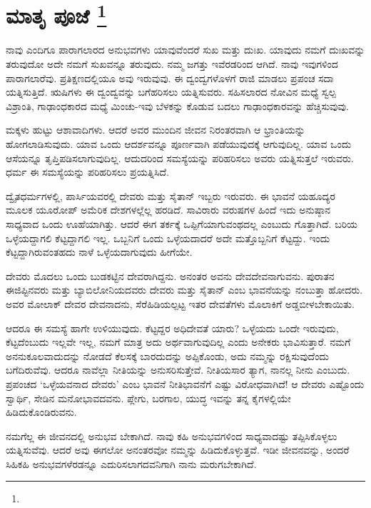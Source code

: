 
\chapter[ಮಾತೃ ಪೂಜೆ ]{ಮಾತೃ ಪೂಜೆ \protect\footnote{}}

ನಾವು ಎಂದಿಗೂ ಪಾರಾಗಲಾರದ ಅನುಭವಗಳು ಯಾವುವೆಂದರೆ ಸುಖ ಮತ್ತು ದುಃಖ. ಯಾವುದು ನಮಗೆ ದುಃಖವನ್ನು ತರುವುದೋ ಅದೇ ನಮಗೆ ಸುಖವನ್ನೂ ತರುವುದು. ನಮ್ಮ ಜಗತ್ತು ಇವೆರಡರಿಂದ ಆಗಿದೆ. ನಾವು ಇವುಗಳಿಂದ ಪಾರಾಗಲಾರೆವು. ಪ್ರತಿಕ್ಷಣದಲ್ಲಿಯೂ ಅವು ಇರುವುವು. ಈ ದ್ವಂದ್ವಗಳೊಳಗೆ ರಾಜಿ ಮಾಡಲು ಪ್ರಪಂಚ ಸದಾ ಯತ್ನಿಸುತ್ತಿದೆ. ಋಷಿಗಳು ಈ ದ್ವಂದ್ವವನ್ನು ಬಗೆಹರಿಸಲು ಯತ್ನಿಸುವರು. ಸಹಿಸಲಾರದ ನೋವಿನ ಮಧ್ಯೆ ಸ್ವಲ್ಪ ವಿಶ್ರಾಂತಿ, ಗಾಢಾಂಧಕಾರದ ಮಧ್ಯೆ ಮಿಂಚು-ಇವು ಬೆಳಕನ್ನು ಕೊಡುವ ಬದಲು ಗಾಢಾಂಧಕಾರವನ್ನು ಹೆಚ್ಚಿಸುವುವು.

ಮಕ್ಕಳು ಹುಟ್ಟು ಆಶಾವಾದಿಗಳು. ಆದರೆ ಅವರ ಮುಂದಿನ ಜೀವನ ನಿರಂತರವಾಗಿ ಆ ಭ್ರಾಂತಿಯನ್ನು ಹೋಗಲಾಡಿಸುವುದು. ಯಾವ ಒಂದು ಆದರ್ಶವನ್ನೂ ಪೂರ್ಣವಾಗಿ ಪಡೆಯುವುದಕ್ಕೆ ಆಗುವುದಿಲ್ಲ. ಯಾವ ಒಂದು ಆಸೆಯನ್ನೂ ತೃಪ್ತಿಪಡಿಸಲಾಗುವುದಿಲ್ಲ. ಆದುದರಿಂದ ಸಮಸ್ಯೆಯನ್ನು ಪರಿಹರಿಸಲು ಅವರು ಯತ್ನಿಸುತ್ತಲೆ ಇರುವರು. ಧರ್ಮ ಈ ಸಮಸ್ಯೆಯನ್ನು ಪರಿಹರಿಸಲು ಪ್ರಯತ್ನಿಸಿದೆ.

ದ್ವೈತಧರ್ಮಗಳಲ್ಲಿ, ಪಾರ್ಸಿಯವರಲ್ಲಿ ದೇವರು ಮತ್ತು ಸೈತಾನ್​ ಇಬ್ಬರು ಇರುವರು. ಈ ಭಾವನೆ ಯಹೂದ್ಯರ ಮೂಲಕ ಯೂರೋಪ್​ ಅಮೆರಿಕ ದೇಶಗಳಲ್ಲೆಲ್ಲ ಹರಡಿದೆ. ಸಾವಿರಾರು ವರುಷಗಳ ಹಿಂದೆ ಇದು ಅನುಷ್ಠಾನ ಸಾಧ್ಯವಾದ ಒಂದು ಊಹೆಯಾಗಿತ್ತು. ಆದರೆ ಈಗ ತರ್ಕಕ್ಕೆ ಒಪ್ಪಿಗೆಯಾಗುವಂಥದಲ್ಲ ಎಂಬುದು ಗೊತ್ತಾಗಿದೆ. ಬರಿಯ ಒಳ್ಳೆಯದ್ದಾಗಲಿ ಕೆಟ್ಟದ್ದಾಗಲಿ ಇಲ್ಲ. ಒಬ್ಬನಿಗೆ ಒಂದು ಒಳ್ಳೆಯದಾದರೆ ಅದೇ ಮತ್ತೊಬ್ಬನಿಗೆ ಕೆಟ್ಟದ್ದು. ಇಂದು ಕೆಟ್ಟದ್ದಾಗಿರುವಂತಹದು ನಾಳೆ ಒಳ್ಳೆಯದಾಗುವುದು ಹೀಗೆಯೇ.

ದೇವರು ಮೊದಲು ಒಂದು ಬುಡಕಟ್ಟಿನ ದೇವರಾಗಿದ್ದನು. ಅನಂತರ ಅವನು ದೇವ\-ದೇವನಾಗುವನು. ಪುರಾತನ ಈಜಿಪ್ಟಿನವರು ಮತ್ತು ಬ್ಯಾಬಿಲೋನಿಯದವರು ದೇವರು ಮತ್ತು ಸೈತಾನ್​ ಎಂಬ ಭಾವನೆಯನ್ನು ನಂಬುತ್ತಾ ಹೋದರು. ಅವರ ಮೋಲಾಕ್​ ದೇವರ ದೇವನಾದನು, ಸೆರೆಹಿಡಿಯಲ್ಪಟ್ಟ ಇತರ ದೇವತೆಗಳು ಮೊಲಾಕಿಗೆ ಅಡ್ಡಬೀಳಬೇಕಾಯಿತು.

ಆದರೂ ಈ ಸಮಸ್ಯೆ ಹಾಗೇ ಉಳಿಯುವುದು. ಕೆಟ್ಟದ್ದರ ಅಧಿದೇವತೆ ಯಾರು? ಒಳ್ಳೆಯದು ಒಂದೇ ಇರುವುದು, ಕೆಟ್ಟದೆಂಬುದು ಇಲ್ಲವೇ ಇಲ್ಲ, ನಮಗೆ ಮಾತ್ರ ಅದು ಅರ್ಥವಾಗುವುದಿಲ್ಲ ಎಂದು ಅನೇಕರು ಭಾವಿಸುತ್ತಾರೆ. ನಮಗೆ ಅನನುಕೂಲವಾದುದನ್ನು ನೋಡದೆ ಕೆಲಸಕ್ಕೆ ಬಾರದುದನ್ನು ಅಪ್ಪಿಕೊಂಡು, ಅದು ನಮ್ಮನ್ನು ರಕ್ಷಿಸುವುದೆಂದು ಬಗೆದಿರುವೆವು. ಆದರೂ ನಾವೆಲ್ಲಾ ನೀತಿಯನ್ನು ಅನುಸರಿಸುತ್ತೇವೆ. ನೀತಿಯಸಾರ ತ್ಯಾಗ, ನಾನಲ್ಲ ನೀನು ಎಂಬುದು. ಪ್ರಪಂಚದ ‘ಒಳ್ಳೆಯವನಾದ ದೇವರು’ ಎಂಬ ಭಾವನೆ ನೀತಿಭಾವನೆಗೆ ಎಷ್ಟು ವಿರೋಧವಾಗಿದೆ! ಆ ದೇವರು ಎಷ್ಟೊಂದು ಸ್ವಾರ್ಥಿ, ಸೇಡಿನ ಮನೋಭಾವದವನು. ಪ್ಲೇಗು, ಬರಗಾಲ, ಯುದ್ಧ ಇವನ್ನು ತನ್ನ ಕೈಗಳಲ್ಲಿಯೇ ಹಿಡಿದುಕೊಂಡಿರುವನು.

ನಮಗೆಲ್ಲ ಈ ಜೀವನದಲ್ಲಿ ಅನುಭವ ಬೇಕಾಗಿದೆ. ನಾವು ಕಹಿ ಅನುಭವಗಳಿಂದ ಸಾಧ್ಯವಾದಷ್ಟು ತಪ್ಪಿಸಿಕೊಳ್ಳಲು ಯತ್ನಿಸುವೆವು. ಆದರೆ ಅವು ಈಗಲೋ ಅನಂತರವೋ ನಮ್ಮನ್ನು ಹಿಡಿದುಕೊಳ್ಳುತ್ತವೆ. ಇಡೀ ಜೀವನವನ್ನು, ಅಂದರೆ ಸಿಹಿಕಹಿ ಅನುಭವಗಳೆರಡನ್ನೂ ಎದುರಿಸಲಾಗದವನಿಗಾಗಿ ನಾನು ಮರುಗಬೇಕಾಗಿದೆ.

\eject

